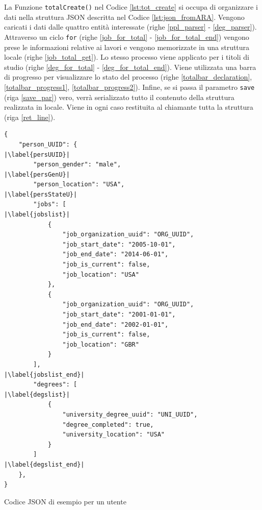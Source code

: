 La Funzione \texttt{totalCreate()} nel Codice \ref{lst:tot_create} si occupa di organizzare i dati nella struttura JSON descritta nel Codice \ref{lst:json_fromARA}. Vengono caricati i dati dalle quattro entità interessate (righe \ref{ppl_parser} - \ref{deg_parser}). Attraverso un ciclo \texttt{for} (righe \ref{job_for_total} - \ref{job_for_total_end}) vengono prese le informazioni relative ai lavori e vengono memorizzate in una struttura locale (righe \ref{job_total_get}). Lo stesso processo viene applicato per i titoli di studio (righe \ref{deg_for_total} - \ref{deg_for_total_end}). Viene utilizzata una barra di progresso per visualizzare lo stato del processo (righe \ref{totalbar_declaration}, \ref{totalbar_progress1}, \ref{totalbar_progress2}). 
Infine, se si passa il parametro \texttt{save} (riga \ref{save_par}) vero, verrà serializzato tutto il contenuto della struttura realizzata in locale. Viene in ogni caso restituita al chiamante tutta la struttura (riga \ref{ret_line}).


\begin{listing}[htbp]
\begin{verbatim}
{
    "person_UUID": {                                            |\label{persUUID}|
        "person_gender": "male",                                |\label{persGenU}|
        "person_location": "USA",                               |\label{persStateU}|
        "jobs": [                                               |\label{jobslist}|
            {
                "job_organization_uuid": "ORG_UUID",
                "job_start_date": "2005-10-01",
                "job_end_date": "2014-06-01",
                "job_is_current": false,
                "job_location": "USA"
            },
            {
                "job_organization_uuid": "ORG_UUID",
                "job_start_date": "2001-01-01",
                "job_end_date": "2002-01-01",
                "job_is_current": false,
                "job_location": "GBR"
            }
        ],                                                      |\label{jobslist_end}|
        "degrees": [                                            |\label{degslist}|
            {
                "university_degree_uuid": "UNI_UUID",
                "degree_completed": true,
                "university_location": "USA"
            }
        ]                                                       |\label{degslist_end}|
    },
}
\end{verbatim} 
\caption{Codice JSON di esempio per un utente}
\label{lst:json_fromARA}
\end{listing}

